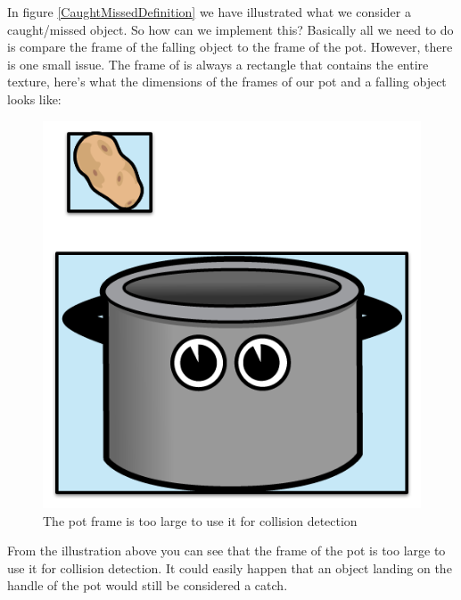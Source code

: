 In figure \ref{CaughtMissedDefinition} we have illustrated what we consider a
caught/missed object. So how can we implement this? Basically all we need to do
is compare the frame of the falling object to the frame of the pot. However,
there is one small issue. The frame of \ccsprite{} is always a rectangle that
contains the entire texture, here's what the dimensions of the frames of our pot
and a falling object looks like:
\begin{figure}[H]
		\centering
		\includegraphics[width=0.3\linewidth]{images/Chapter3/frame_pot_falling_object.png}
		\caption{The pot frame is too large to use it for collision detection}
\end{figure}
From the illustration above you can see that the frame of the pot is too large
to use it for collision detection. It could easily happen that an object
landing on the handle of the pot would still be considered a catch.

